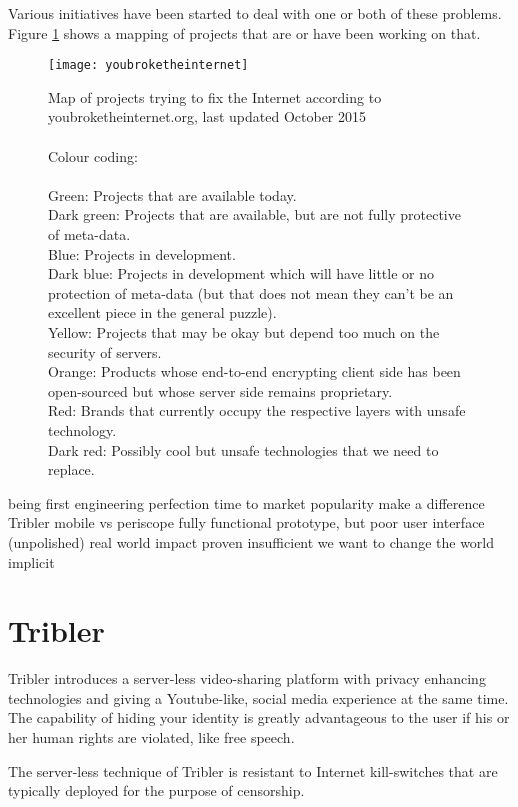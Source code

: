 Various initiatives have been started to deal with one or both of these problems.
Figure \ref{fig:youbroketheinternet} shows a mapping of projects that are or have been working on that.
\\
\begin{figure}[h]
	\centering
	\texttt{[image: youbroketheinternet]}
	\caption{Map of projects trying to fix the Internet according to youbroketheinternet.org, last updated October 2015\\
		\\
		Colour coding:\\
		\\
		\textcolor[RGB]{51,204,51}{Green:} Projects that are available today.\\
		\textcolor[RGB]{86,149,38}{Dark green:} Projects that are available, but are not fully protective of meta-data.\\
		\textcolor[RGB]{89,204,255}{Blue:} Projects in development.\\
		\textcolor[RGB]{17,153,211}{Dark blue:} Projects in development which will have little or no protection of meta-data (but that does not mean they can't be an excellent piece in the general puzzle).\\
		\textcolor[RGB]{226,228,27}{Yellow:} Projects that may be okay but depend too much on the security of servers.\\
		\textcolor[RGB]{255,153,51}{Orange:} Products whose end-to-end encrypting client side has been open-sourced but whose server side remains proprietary.\\
		\textcolor[RGB]{225,77,93}{Red:} Brands that currently occupy the respective layers with unsafe technology.\\
		\textcolor[RGB]{155,35,25}{Dark red:} Possibly cool but unsafe technologies that we need to replace.}
	\label{fig:youbroketheinternet}
\end{figure}




being first
engineering perfection
time to market
popularity
make a difference
Tribler mobile vs periscope
fully functional prototype, but poor user interface (unpolished)
real world impact proven insufficient
we want to change the world implicit


\section{Tribler}

Tribler introduces a server-less video-sharing platform with privacy enhancing technologies and giving a Youtube-like, social media experience at the same time.
The capability of hiding your identity is greatly advantageous to the user if his or her human rights are violated, like free speech.

The server-less technique of Tribler is resistant to Internet kill-switches that are typically deployed for the purpose of censorship.


